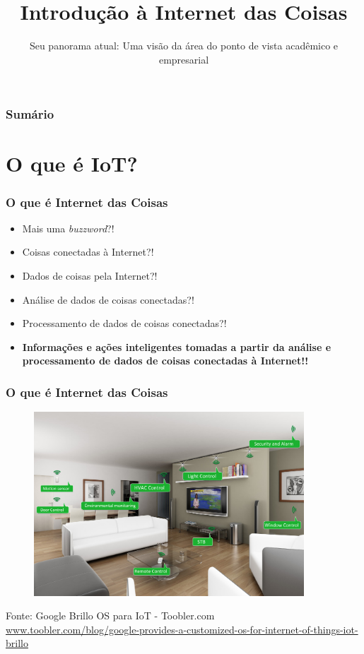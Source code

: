 \documentclass{beamer}
\title{Introdução à Internet das Coisas}
\subtitle{Seu panorama atual: Uma visão da área do ponto de vista acadêmico e empresarial}
\begin{document}
\frame{\titlepage}

\begin{frame}
\frametitle{Sumário}
\tableofcontents
\end{frame}

\section{O que é IoT?}

\begin{frame}
\frametitle{O que é Internet das Coisas}

\begin{itemize}
	\item Mais uma \textit{buzzword}?!
	\item Coisas conectadas à Internet?!
	\item Dados de coisas pela Internet?!
	\item Análise de dados de coisas conectadas?!
	\item Processamento de dados de coisas conectadas?!
	\item \textbf{Informações e ações inteligentes tomadas a partir da análise e processamento de dados de coisas conectadas à Internet!!}
\end{itemize}
\end{frame}

\begin{frame}
	\frametitle{O que é Internet das Coisas}
	\begin{figure}
		\includegraphics[width=0.9\textwidth]{home-automation-google-brillo-os-1-1024x699}
	\end{figure}
	\scriptsize Fonte: Google Brillo OS para IoT - Toobler.com\\
	\tiny \url{www.toobler.com/blog/google-provides-a-customized-os-for-internet-of-things-iot-brillo}
\end{frame}
\end{document}
